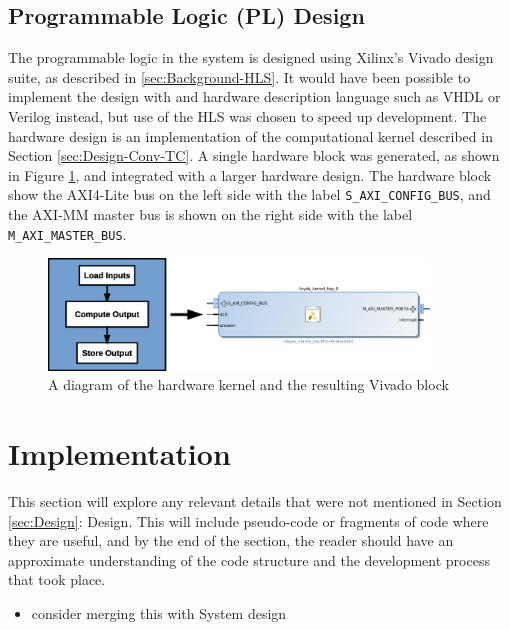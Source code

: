 \documentclass[12pt]{article}
\begin{document}
\subsection{Programmable Logic (PL) Design}
\label{sec:Design-PL}

The programmable logic in the system is designed using Xilinx's Vivado design suite, as described in \ref{sec:Background-HLS}. It would have been possible to implement the design with and hardware description language such as VHDL or Verilog instead, but use of the HLS was chosen to speed up development. The hardware design is an implementation of the computational kernel described in Section \ref{sec:Design-Conv-TC}. A single hardware block was generated, as shown in Figure \ref{fig:hlsConv}, and integrated with a larger hardware design. The hardware block show the AXI4-Lite bus on the left side with the label \lstinline|S_AXI_CONFIG_BUS|, and the AXI-MM master bus is shown on the right side with the label \lstinline|M_AXI_MASTER_BUS|.

\begin{figure} [H]
\centering
\includegraphics[width=0.9\textwidth]{figures/hls_conv.eps}
\caption{A diagram of the hardware kernel and the resulting Vivado block} 
\label{fig:hlsConv}
\end{figure}

\newpage

\section{Implementation}
\label{sec:Imp}

This section will explore any relevant details that were not mentioned in Section \ref{sec:Design}: Design. This will include pseudo-code or fragments of code where they are useful, and by the end of the section, the reader should have an approximate understanding of the code structure and the development process that took place.

\begin{itemize}
\item consider merging this with System design
\end{itemize}
\end{document}
